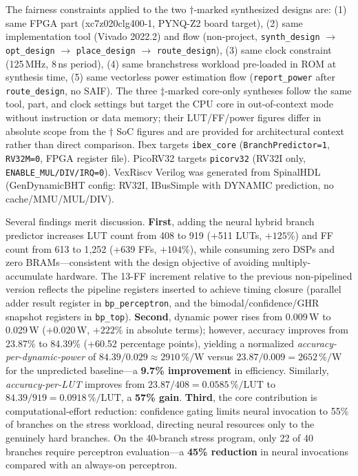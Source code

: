 \documentclass[12pt,a4paper]{article}
\begin{document}
The fairness constraints applied to the two $\dagger$-marked synthesized designs are:
(1) same FPGA part (xc7z020clg400-1, PYNQ-Z2 board target),
(2) same implementation tool (Vivado 2022.2) and flow (non-project,
\texttt{synth\_design} $\rightarrow$ \texttt{opt\_design} $\rightarrow$
\texttt{place\_design} $\rightarrow$ \texttt{route\_design}),
(3) same clock constraint (125\,MHz, 8\,ns period),
(4) same branchstress workload pre-loaded in ROM at synthesis time,
(5) same vectorless power estimation flow (\texttt{report\_power} after
\texttt{route\_design}, no SAIF).
The three $\ddagger$-marked core-only syntheses follow the same tool, part, and clock
settings but target the CPU core in out-of-context mode without instruction or
data memory; their LUT/FF/power figures differ in absolute scope from the
$\dagger$ SoC figures and are provided for architectural context rather than
direct comparison.
Ibex targets \texttt{ibex\_core} (\texttt{BranchPredictor=1}, \texttt{RV32M=0},
FPGA register file).
PicoRV32 targets \texttt{picorv32} (RV32I only,
\texttt{ENABLE\_MUL/DIV/IRQ=0}).
VexRiscv Verilog was generated from SpinalHDL (GenDynamicBHT config:
RV32I, IBusSimple with DYNAMIC prediction, no cache/MMU/MUL/DIV).

Several findings merit discussion.
\textbf{First}, adding the neural hybrid branch predictor increases LUT count
from 408 to 919 (+511 LUTs, \(+125\%\)) and FF count from 613 to 1{,}252
(+639 FFs, \(+104\%\)), while consuming zero DSPs and zero BRAMs---consistent
with the design objective of avoiding multiply-accumulate hardware.
The 13-FF increment relative to the previous non-pipelined version
reflects the pipeline registers inserted to achieve timing closure (parallel
adder result register in \texttt{bp\_perceptron}, and the bimodal/confidence/GHR
snapshot registers in \texttt{bp\_top}).
\textbf{Second}, dynamic power rises from 0.009\,W to 0.029\,W
(+0.020\,W, \(+222\%\) in absolute terms); however, accuracy improves from
23.87\% to 84.39\% (+60.52 percentage points), yielding a normalized
\emph{accuracy-per-dynamic-power} of $84.39 / 0.029 \approx 2910\,\%/\text{W}$
versus $23.87 / 0.009 = 2652\,\%/\text{W}$ for the unpredicted baseline---a
\textbf{9.7\% improvement} in efficiency.
Similarly, \emph{accuracy-per-LUT} improves from $23.87/408 = 0.0585\,\%/\text{LUT}$
to $84.39/919 = 0.0918\,\%/\text{LUT}$, a \textbf{57\% gain}.
\textbf{Third}, the core contribution is computational-effort reduction:
confidence gating limits neural invocation to 55\% of branches on the stress
workload, directing neural resources only to the genuinely hard branches.
On the 40-branch stress program, only 22 of 40 branches require perceptron
evaluation---a \textbf{45\% reduction} in neural invocations compared with an
always-on perceptron.
\end{document}
